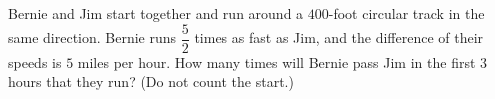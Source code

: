 Bernie and Jim start together and run around a $400$-foot circular track in the same direction. Bernie runs $\dfrac{5}{2}$ times as fast as Jim, and the difference of their speeds is $5$ miles per hour. How many times will Bernie pass Jim in the first $3$ hours that they run? (Do not count the start.)

